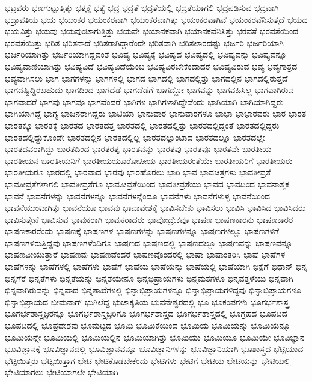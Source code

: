 {ಭಟ್ರವರು
ಭಣಗುಟ್ಟುತ್ತಿತ್ತು
ಭತ್ತಕ್ಕೆ
ಭತ್ಯೆ
ಭದ್ರ
ಭದ್ರತೆ
ಭದ್ರತೆಯಲ್ಲಿ
ಭದ್ರತೆಯಾಗಲಿ
ಭದ್ರಪಡಿಸುವ
ಭದ್ರವಾಗಿ
ಭದ್ರಾವತಿಯ
ಭಯ
ಭಯಂಕರ
ಭಯಂಕರವಾಗಿ
ಭಯಂಕರವಾಗಿತ್ತು
ಭಯಂಕರವಾಗಿವೆ
ಭಯಂಕರವೆನಿಸುತ್ತದೆ
ಭಯದ
ಭಯವಿತ್ತು
ಭಯವು
ಭಯವುಂಟಾಗುತ್ತಿತ್ತು
ಭಯವೇ
ಭಯಾನಕವಾಗಿ
ಭಯಾನಕವೆನಿಸಿತ್ತು
ಭರವಸೆ
ಭರವಸೆಯಿಂದ
ಭರವಸೆಯಿತ್ತು
ಭರಿತ
ಭರಿತನಾದೆ
ಭರಿತರಾಗಿದ್ದಾರೆಂದೇ
ಭರಿತವಾಗಿ
ಭರಿಸಲಾರದಷ್ಟು
ಭರ್ಜರಿ
ಭರ್ಜರಿಯಾಗಿ
ಭರ್ಜರಿಯಾಗಿತ್ತು
ಭರ್ಜರಿಯಾಗಿದ್ದವಂತೆ
ಭವಿಷ್ಯ
ಭವಿಷ್ಯಕ್ಕೆ
ಭವಿಷ್ಯದ
ಭವಿಷ್ಯದಲ್ಲಿ
ಭವಿಷ್ಯವನ್ನು
ಭವಿಷ್ಯವನ್ನೂ
ಭವಿಷ್ಯವಾಣಿಯಾಗಿತ್ತು
ಭವಿಷ್ಯವಿದೆ
ಭವಿಷ್ಯವಿದೆಯೆಂಬ
ಭವಿಷ್ಯವಿರಬೇಕೆಂದಾದರೆ
ಭವಿಷ್ಯವಿರುವ
ಭವ್ಯ
ಭವ್ಯಗಾತ್ರದ
ಭವ್ಯವಾಗಿಸಲು
ಭಾಗ
ಭಾಗಗಳನ್ನು
ಭಾಗಗಳಲ್ಲಿ
ಭಾಗದ
ಭಾಗದಲ್ಲಿ
ಭಾಗದಲ್ಲಿತ್ತು
ಭಾಗದಲ್ಲಿನ
ಭಾಗದಲ್ಲಿರುತ್ತದೆ
ಭಾಗದಷ್ಟಿದ್ದಿರಬಹುದು
ಭಾಗದಿಂದ
ಭಾಗದೆಡೆ
ಭಾಗದೆಡೆಗೆ
ಭಾಗದ್ದೋ
ಭಾಗವನ್ನು
ಭಾಗವಹಿಸಿಲ್ಲ
ಭಾಗವಾಗಿರುವ
ಭಾಗವಾದರೆ
ಭಾಗವು
ಭಾಗವೂ
ಭಾಗವೆಂದರೆ
ಭಾಗಿಗಳ
ಭಾಗಿಗಳಾಗಿದ್ದೇವೆಂದು
ಭಾಗಿಯಾಗಿ
ಭಾಗಿಯಾಗಿದ್ದರು
ಭಾಗಿಯಾಗಿದ್ದೆ
ಭಾಗ್ಯ
ಭಾಜನರಾಗಿದ್ದರು
ಭಾಟಿಯಾ
ಭಾನುವಾರ
ಭಾನುವಾರಗಳೂ
ಭಾಭಾ
ಭಾಭಾರವರು
ಭಾರ
ಭಾರತ
ಭಾರತಕ್ಕೂ
ಭಾರತಕ್ಕೆ
ಭಾರತದ
ಭಾರತದತ್ತ
ಭಾರತದಲ್ಲಿ
ಭಾರತದಲ್ಲಿತ್ತು
ಭಾರತದಲ್ಲಿದ್ದಂತೆ
ಭಾರತದಲ್ಲಿದ್ದರು
ಭಾರತದಲ್ಲಿದ್ದುಕೊಂಡೇ
ಭಾರತದಲ್ಲಿನ
ಭಾರತದಲ್ಲಿಲ್ಲ
ಭಾರತದಲ್ಲುಂಟಾದ
ಭಾರತದಲ್ಲೂ
ಭಾರತದಲ್ಲೇ
ಭಾರತದವರಾಗಿದ್ದು
ಭಾರತದಿಂದ
ಭಾರತರತ್ನ
ಭಾರತವನ್ನು
ಭಾರತವು
ಭಾರತವೂ
ಭಾರತವೇ
ಭಾರತೀಯ
ಭಾರತೀಯನ
ಭಾರತೀಯನಿಗೆ
ಭಾರತೀಯಯೂರೋಪೀಯ
ಭಾರತೀಯರಂತೆಯೇ
ಭಾರತೀಯರಿಗೆ
ಭಾರತೀಯರು
ಭಾರತೀಯರೂ
ಭಾರದಲ್ಲಿ
ಭಾರವಾದ
ಭಾರವು
ಭಾರಹೊರಲು
ಭಾರಿ
ಭಾವ
ಭಾವಚಿತ್ರಗಳು
ಭಾವತೀವ್ರತೆ
ಭಾವತೀವ್ರತೆಗಳಾಗಲಿ
ಭಾವತೀವ್ರತೆಗೂ
ಭಾವತೀವ್ರತೆಯಿಂದ
ಭಾವತೀವ್ರತೆಯು
ಭಾವದ
ಭಾವದಿಂದ
ಭಾವನಾತ್ಮಕ
ಭಾವನೆ
ಭಾವನೆಗಳನ್ನು
ಭಾವನೆಗಳನ್ನೂ
ಭಾವನೆಗಳನ್ನೆಂದೂ
ಭಾವನೆಗಳು
ಭಾವನೆಗಳುಳ್ಳ
ಭಾವನೆಯಿಂದ
ಭಾವನೆಯುಂಟಾಗಿತ್ತು
ಭಾವನೆಯೂ
ಭಾವವು
ಭಾವಾವೇಶಕ್ಕೆ
ಭಾವಿಸಬೇಕು
ಭಾವಿಸಲು
ಭಾವಿಸಿ
ಭಾವಿಸಿದ
ಭಾವಿಸಿದರು
ಭಾವಿಸುತ್ತೇನೆ
ಭಾವಿಸುವ
ಭಾವುಕರಾಗಿ
ಭಾವುಕರಾದರು
ಭಾವೋದ್ರೇಕವೂ
ಭಾಷಣ
ಭಾಷಣಕಾರನು
ಭಾಷಣಕಾರರ
ಭಾಷಣಕಾರರೆಂದು
ಭಾಷಣಕ್ಕೆ
ಭಾಷಣಗಳ
ಭಾಷಣಗಳನ್ನು
ಭಾಷಣಗಳನ್ನೂ
ಭಾಷಣಗಳಲ್ಲೂ
ಭಾಷಣಗಳಿಗೆ
ಭಾಷಣಗಳಿರುತ್ತಿದ್ದವು
ಭಾಷಣಗಳೆಂದಿಗೂ
ಭಾಷಣದ
ಭಾಷಣದಲ್ಲಿ
ಭಾಷಣದಲ್ಲೂ
ಭಾಷಣವನ್ನು
ಭಾಷಣವನ್ನೂ
ಭಾಷಣವೀಯುತ್ತಾರೆ
ಭಾಷಣವು
ಭಾಷಣವೆಂದರೆ
ಭಾಷಣವೊಂದರಲ್ಲಿ
ಭಾಷಾ
ಭಾಷಾಂತರಿಸಿ
ಭಾಷೆ
ಭಾಷೆಗಳ
ಭಾಷೆಗಳನ್ನು
ಭಾಷೆಗಳಲ್ಲಿ
ಭಾಷೆಗಳು
ಭಾಷೆಗೆ
ಭಾಷೆಯ
ಭಾಷೆಯನ್ನು
ಭಾಷೆಯಲ್ಲಿ
ಭಾಷೆಯಾಗಿ
ಭಿಕ್ಷೆಗೆ
ಭಿಧಾನ್
ಭಿನ್ನ
ಭಿನ್ನಗೆರೆ
ಭಿನ್ನತೆಗಳು
ಭಿನ್ನತೆಯನ್ನು
ಭಿನ್ನತೆಯೇನೂ
ಭಿನ್ನಭಿಪ್ರಾಯಗಳು
ಭಿನ್ನಮತಗಳೂ
ಭಿನ್ನವತ್ತಳೆಯು
ಭಿನ್ನವಾಗಿ
ಭಿನ್ನವಾಗಿರುವನ್ನು
ಭಿನ್ನವಾದ
ಭಿನ್ನಶಾಖೆಗಳಲ್ಲಿ
ಭಿನ್ನಾಭಿಪ್ರಾಯಗಳನ್ನೂ
ಭಿನ್ನಾಭಿಪ್ರಾಯಗಳಿದ್ದವು
ಭಿನ್ನಾಭಿಪ್ರಾಯಗಳೂ
ಭಿನ್ನಾಭಿಪ್ರಾಯದ
ಭೀಮನಾಗ್
ಭುಗಿಲೆದ್ದ
ಭುಜಾಕೃತಿಯ
ಭುವನೇಶ್ವರದಲ್ಲಿ
ಭೂ
ಭೂಕಂಪಗಳು
ಭೂಗರ್ಭಶಾಸ್ತ್ರ
ಭೂಗರ್ಭಶಾಸ್ತ್ರಜ್ಞರನ್ನೂ
ಭೂಗರ್ಭಶಾಸ್ತ್ರಜ್ಞರಿಗೂ
ಭೂಗರ್ಭಶಾಸ್ತ್ರದ
ಭೂಗರ್ಭಶಾಸ್ತ್ರದಲ್ಲಿ
ಭೂಗ್ರಹದ
ಭೂಪಟದ
ಭೂಪಟದಲ್ಲಿ
ಭೂಪ್ರದೇಶವು
ಭೂಮಟ್ಟದ
ಭೂಮಿ
ಭೂಮಿಕೆಯಿಂದ
ಭೂಮಿಯ
ಭೂಮಿಯನ್ನು
ಭೂಮಿಯನ್ನೂ
ಭೂಮಿಯನ್ನೇ
ಭೂಮಿಯಲ್ಲಿ
ಭೂಮಿಯಲ್ಲಿನ
ಭೂಮಿಯಾಗಿತ್ತು
ಭೂಮಿಯು
ಭೂಮಿಯೂ
ಭೂಮಿಯೇ
ಭೂವಿಜ್ಞಾನ
ಭೂವಿಜ್ಞಾನಕ್ಕೆ
ಭೂವಿಜ್ಞಾನದಲ್ಲಿ
ಭೂವಿಜ್ಞಾನವನ್ನೂ
ಭೂವಿಜ್ಞಾನಿಗಳನ್ನು
ಭೂವಿಜ್ಞಾನಿಯಾಗಿ
ಭೂಶಾಸ್ತ್ರದ
ಭೆಟ್ಟಿಯಾದ
ಭೆಟ್ಟಿಯಿತ್ತರು
ಭೆಟ್ಟಿಯಿತ್ತಾಗ
ಭೇಟಿ
ಭೇಟಿಕೊಡಬೇಕೆಂದು
ಭೇಟಿಗಳು
ಭೇಟಿಗೆ
ಭೇಟಿಯ
ಭೇಟಿಯನ್ನು
ಭೇಟಿಯಲ್ಲಿ
ಭೇಟಿಯಾಗಲು
ಭೇಟಿಯಾಗಲೇ
ಭೇಟಿಯಾಗಿ
}
